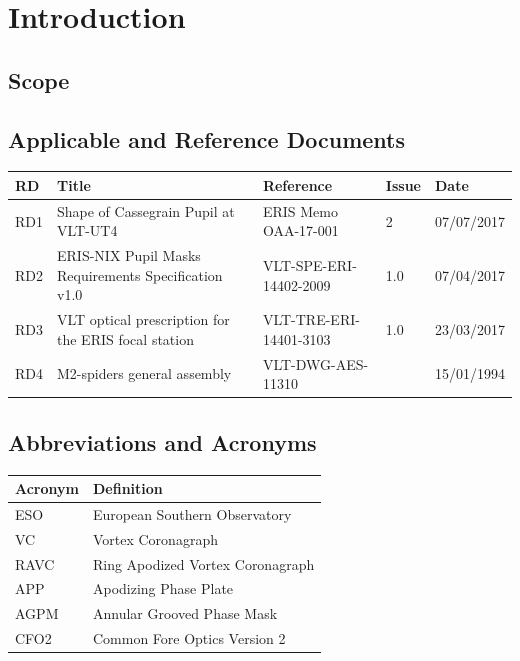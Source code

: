\documentclass[a4paper,11pt]{article}
\begin{document}
\clearpage
\tableofcontents

\listoffigures

\listoftables

\clearpage

\section{Introduction}

\subsection{Scope}

\subsection{Applicable and Reference Documents}

\begin{tabular}{@{}lp{6cm}lll@{}}
\toprule
RD 	& Title 							& Reference & Issue & Date \\
\midrule
RD1	& Shape of Cassegrain Pupil at VLT-UT4      			& ERIS Memo OAA-17-001		&2       & 07/07/2017  \\
	RD2	& ERIS-NIX Pupil Masks Requirements Specification v1.0      	& VLT-SPE-ERI-14402-2009	&1.0     & 07/04/2017  \\
RD3	& VLT optical prescription for the ERIS focal station       	& VLT-TRE-ERI-14401-3103	&1.0	&  23/03/2017  \\
RD4	& M2-spiders general assembly     				& VLT-DWG-AES-11310		&	&  15/01/1994 \\
\bottomrule
\end{tabular}

\subsection{Abbreviations and Acronyms}

\begin{tabular}{@{}ll@{}}
\toprule
Acronym & Definition \\
\midrule
ESO     & European Southern Observatory \\
VC      & Vortex Coronagraph           \\
RAVC    & Ring Apodized Vortex Coronagraph \\
APP     & Apodizing Phase Plate        \\
AGPM    & Annular Grooved Phase Mask   \\
CFO2    & Common Fore Optics Version 2 \\
\bottomrule
\end{tabular}
\end{document}
